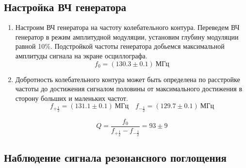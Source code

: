 \documentclass[14pt, a4paper]{report}
\begin{document}
\subsection{Настройка ВЧ генератора}

\begin{enumerate}

\item Настроим ВЧ генератора на частоту колебательного контура. Переведем ВЧ генератор в режим амплитудной модуляции, установим глубину модуляции равной 10\%. Подстройкой частоты генератора добьемся максимальной амплитуды сигнала на экране осциллографа.
\[f_0=(130.3\pm0.1)\ МГц\]

\item Добротность колебательного контура может быть определена по расстройке частоты до достижения сигналом половины от максимального достижения в сторону больших и маленьких частот.
\[f_{+\frac{1}{2}}=(131.1\pm0.1)\ МГц\quad f_{-\frac{1}{2}}=(129.7\pm0.1)\ МГц\]

\[Q=\frac{f_0}{f_{+\frac{1}{2}}-f_{-\frac{1}{2}}}=93\pm9\]

\end{enumerate}

\subsection{Наблюдение сигнала резонансного поглощения}
\end{document}
